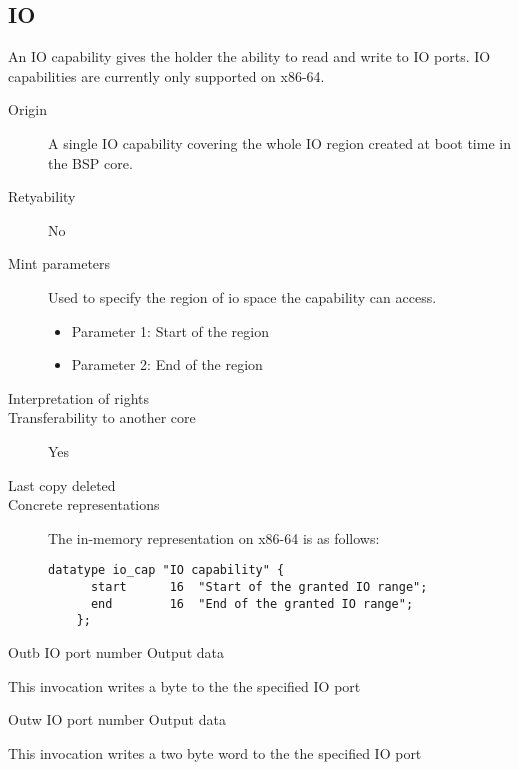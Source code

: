 \subsection{IO}
An IO capability gives the holder the ability to read and write to IO ports.
IO capabilities are currently only supported on x86-64.

\begin{description}
\item[Origin] A single IO capability covering the whole IO region created at
  boot time in the BSP core.
  
\item[Retyability] No
  
\item[Mint parameters] Used to specify the region of io space the capability can access.
  \begin{itemize}
  \item Parameter 1: Start of the region
  \item Parameter 2: End of the region
  \end{itemize}
  
\item[Interpretation of rights] 
  
\item[Transferability to another core] Yes

\item[Last copy deleted] 
  
\item[Concrete representations] The in-memory representation on x86-64 is as follows:
  
  \begin{lstlisting}[language=Mackerel]
    datatype io_cap "IO capability" {
      start      16  "Start of the granted IO range";
      end        16  "End of the granted IO range";
    };
  \end{lstlisting}
\end{description}

\begin{invocation}{Outb}
  \arg IO port number
  \arg Output data
\end{invocation}
This invocation writes a byte to the the specified IO port

\begin{invocation}{Outw}
  \arg IO port number
  \arg Output data
\end{invocation}
This invocation writes a two byte word to the the specified IO port

